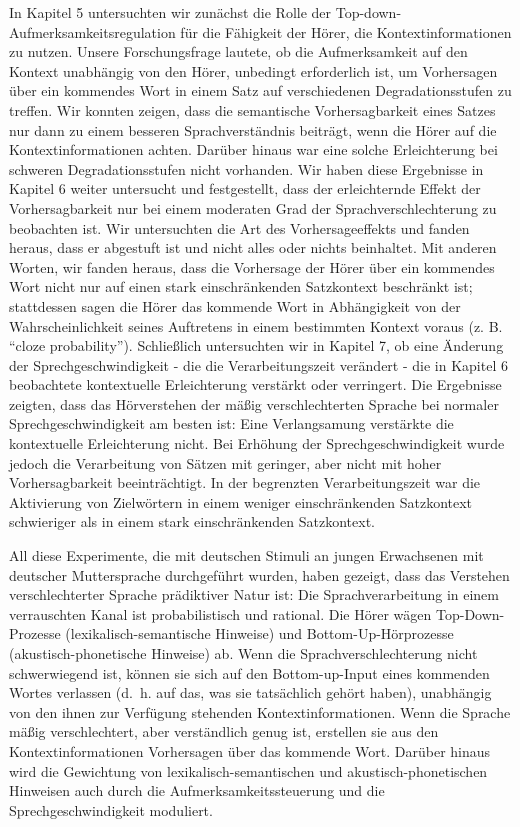 \documentclass[a4paper, nobind]{templates/ociamthesis}
\begin{document}
\begin{romanpages}
\begin{abstractsecond}
In Kapitel 5 untersuchten wir zunächst die Rolle der Top-down-Aufmerksamkeitsregulation für die Fähigkeit der Hörer, die Kontextinformationen zu nutzen. Unsere Forschungsfrage lautete, ob die Aufmerksamkeit auf den Kontext unabhängig von den Hörer, unbedingt erforderlich ist, um Vorhersagen über ein kommendes Wort in einem Satz auf verschiedenen Degradationsstufen zu treffen. Wir konnten zeigen, dass die semantische Vorhersagbarkeit eines Satzes nur dann zu einem besseren Sprachverständnis beiträgt, wenn die Hörer auf die Kontextinformationen achten. Darüber hinaus war eine solche Erleichterung bei schweren Degradationsstufen nicht vorhanden. Wir haben diese Ergebnisse in Kapitel 6 weiter untersucht und festgestellt, dass der erleichternde Effekt der Vorhersagbarkeit nur bei einem moderaten Grad der Sprachverschlechterung zu beobachten ist. Wir untersuchten die Art des Vorhersageeffekts und fanden heraus, dass er abgestuft ist und nicht alles oder nichts beinhaltet. Mit anderen Worten, wir fanden heraus, dass die Vorhersage der Hörer über ein kommendes Wort nicht nur auf einen stark einschränkenden Satzkontext beschränkt ist; stattdessen sagen die Hörer das kommende Wort in Abhängigkeit von der Wahrscheinlichkeit seines Auftretens in einem bestimmten Kontext voraus (z. B. ``cloze probability''). Schließlich untersuchten wir in Kapitel 7, ob eine Änderung der Sprechgeschwindigkeit - die die Verarbeitungszeit verändert - die in Kapitel 6 beobachtete kontextuelle Erleichterung verstärkt oder verringert. Die Ergebnisse zeigten, dass das Hörverstehen der mäßig verschlechterten Sprache bei normaler Sprechgeschwindigkeit am besten ist: Eine Verlangsamung verstärkte die kontextuelle Erleichterung nicht. Bei Erhöhung der Sprechgeschwindigkeit wurde jedoch die Verarbeitung von Sätzen mit geringer, aber nicht mit hoher Vorhersagbarkeit beeinträchtigt. In der begrenzten Verarbeitungszeit war die Aktivierung von Zielwörtern in einem weniger einschränkenden Satzkontext schwieriger als in einem stark einschränkenden Satzkontext.

All diese Experimente, die mit deutschen Stimuli an jungen Erwachsenen mit deutscher Muttersprache durchgeführt wurden, haben gezeigt, dass das Verstehen verschlechterter Sprache prädiktiver Natur ist: Die Sprachverarbeitung in einem verrauschten Kanal ist probabilistisch und rational. Die Hörer wägen Top-Down-Prozesse (lexikalisch-semantische Hinweise) und Bottom-Up-Hörprozesse (akustisch-phonetische Hinweise) ab. Wenn die Sprachverschlechterung nicht schwerwiegend ist, können sie sich auf den Bottom-up-Input eines kommenden Wortes verlassen (d.~h. auf das, was sie tatsächlich gehört haben), unabhängig von den ihnen zur Verfügung stehenden Kontextinformationen. Wenn die Sprache mäßig verschlechtert, aber verständlich genug ist, erstellen sie aus den Kontextinformationen Vorhersagen über das kommende Wort. Darüber hinaus wird die Gewichtung von lexikalisch-semantischen und akustisch-phonetischen Hinweisen auch durch die Aufmerksamkeitssteuerung und die Sprechgeschwindigkeit moduliert.


\end{abstractsecond}
\end{romanpages}
\end{document}
